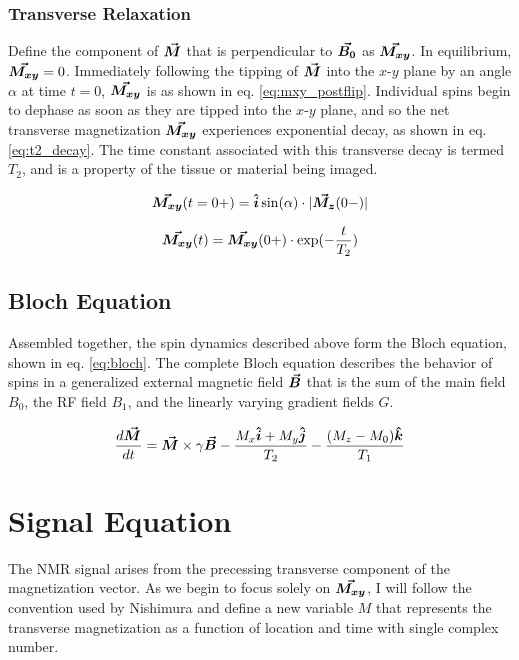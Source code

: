\subsubsection{Transverse Relaxation}
Define the component of $\bm{\vec{M}}$ that is perpendicular to $\bm{\vec{B_0}}$ as $\bm{\vec{M_{xy}}}$. In equilibrium,
$\bm{\vec{M_{xy}}} = 0$.  Immediately following the tipping of $\bm{\vec{M}}$ into the $x$-$y$ plane by an angle $\alpha$ at
time $t=0$, $\bm{\vec{M_{xy}}}$ is as shown in eq. \ref{eq:mxy_postflip}. Individual spins begin to dephase as soon as they
are tipped into the $x$-$y$ plane, and so the net transverse magnetization $\bm{\vec{M_{xy}}}$ experiences exponential
decay, as shown in eq. \ref{eq:t2_decay}. The time constant associated with this transverse decay is termed $T_2$, and
is a property of the tissue or material being imaged.

\begin{equation}\label{eq:mxy_postflip}
    \bm{\vec{M_{xy}}}(t=0+) = \bm{\hat{i}}\sin(\alpha) \cdot |\bm{\vec{M_z}}(0-)|
\end{equation}

\begin{equation}\label{eq:t2_decay}
    \bm{\vec{M_{xy}}}(t) = \bm{\vec{M_{xy}}}(0+) \cdot \exp(-\frac{t}{T_2})
\end{equation}

\subsection{Bloch Equation}
Assembled together, the spin dynamics described above form the Bloch equation, shown in eq. \ref{eq:bloch}. The complete
Bloch equation describes the behavior of spins in a generalized external magnetic field $\bm{\vec{B}}$ that is the sum of
the main field $B_0$, the RF field $B_1$, and the linearly varying gradient fields $G$. 

\begin{equation}\label{eq:bloch}
    \frac{d \bm{\vec{M}}}{dt} = \bm{\vec{M}} \times \gamma \bm{\vec{B}} - \frac{M_x \bm{\hat{i}} + M_y \bm{\hat{j}}}{T_2} - \frac{(M_z - M_0)
    \bm{\hat{k}}}{T_1}
\end{equation}

\section{Signal Equation}
The NMR signal arises from the precessing transverse component of the magnetization vector. As we begin to focus solely
on $\bm{\vec{M_{xy}}}$, I will follow the convention used by Nishimura \cite{nishimura} and define a new variable $M$ that
represents the transverse magnetization as a function of location and time with single complex number.

